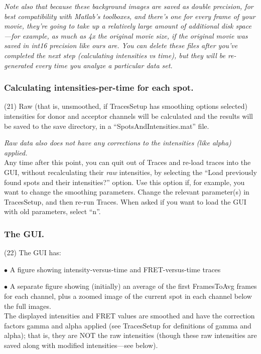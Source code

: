 \documentclass[11pt]{article}
\begin{document}
{\it Note also that because these background images are saved as double precision, for best compatibility with Matlab's toolboxes, and there's one for every frame of your movie, they're going to take up a relatively large amount of additional disk space---for example, as much as 4x the original movie size, if the original movie was saved in int16 precision like ours are.  You can delete these files after you've completed the next step (calculating intensities vs time), but they will be re-generated every time you analyze a particular data set. }

\subsubsection{Calculating intensities-per-time for each spot.}

\noindent (21) Raw (that is, unsmoothed, if TracesSetup has smoothing options selected) intensities for donor and acceptor channels will be calculated and the results will be saved to the save directory, in a ``SpotsAndIntensities.mat'' file.  

{\it Raw data also does not have any corrections to the intensities (like alpha) applied.}\\

\noindent Any time after this point, you can quit out of Traces and re-load traces into the GUI, without recalculating their {\it raw} intensities, by selecting the ``Load previously found spots and their intensities?'' option.  Use this option if, for example, you want to change the smoothing parameters. Change the relevant parameter(s) in TracesSetup, and then re-run Traces. When asked if you want to load the GUI with old parameters, select ``n''.

\subsubsection{The GUI.}\label{sec:GUI}

\noindent (22) The GUI has:

$\bullet$ A figure showing intensity-versus-time and FRET-versus-time traces

$\bullet$ A separate figure showing (initially) an average of the first FramesToAvg frames for each channel, plus a zoomed image of the current spot in each channel below the full images. \\

\noindent The displayed intensities and FRET values are smoothed and have the correction factors gamma and alpha applied (see TracesSetup for definitions of gamma and alpha); that is, they are NOT the raw intensities (though these raw intensities are saved along with modified intensities---see below). \\
\end{document}
